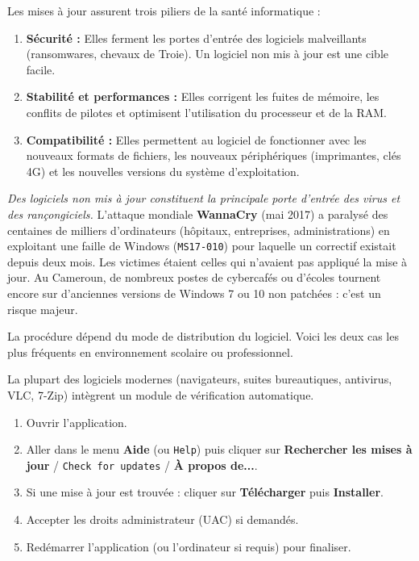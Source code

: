 \documentclass[11pt]{article}
\newcounter{popsec}
\newcounter{popsub}
\newcommand{\courssub}[1]{%
  \stepcounter{popsub}%
  \par\vspace{9pt}\noindent{\popxbold\fontsize{11.5}{13}\selectfont\color{popink}{\color{poporange}\thepopsec.\thepopsub}\hspace{6pt}#1}\par\nopagebreak\vspace{4pt}
}
\begin{document}
\begin{propriete}
Les mises à jour assurent trois piliers de la santé informatique :
\begin{enumerate}
    \item \textbf{Sécurité :} Elles ferment les portes d'entrée des logiciels malveillants (ransomwares, chevaux de Troie). Un logiciel non mis à jour est une cible facile.
    \item \textbf{Stabilité et performances :} Elles corrigent les fuites de mémoire, les conflits de pilotes et optimisent l'utilisation du processeur et de la RAM.
    \item \textbf{Compatibilité :} Elles permettent au logiciel de fonctionner avec les nouveaux formats de fichiers, les nouveaux périphériques (imprimantes, clés 4G) et les nouvelles versions du système d'exploitation.
\end{enumerate}
\end{propriete}

\begin{attention}
\emph{Des logiciels non mis à jour constituent la principale porte d'entrée des virus et des rançongiciels.} L'attaque mondiale \textbf{WannaCry} (mai 2017) a paralysé des centaines de milliers d'ordinateurs (hôpitaux, entreprises, administrations) en exploitant une faille de Windows (\texttt{MS17-010}) pour laquelle un correctif existait depuis deux mois. Les victimes étaient celles qui n'avaient pas appliqué la mise à jour. Au Cameroun, de nombreux postes de cybercafés ou d'écoles tournent encore sur d'anciennes versions de Windows 7 ou 10 non patchées : c'est un risque majeur.
\end{attention}

\courssub{Comment mettre à jour une application ?}

La procédure dépend du mode de distribution du logiciel. Voici les deux cas les plus fréquents en environnement scolaire ou professionnel.

\begin{methode}
La plupart des logiciels modernes (navigateurs, suites bureautiques, antivirus, VLC, 7-Zip) intègrent un module de vérification automatique.
\begin{enumerate}
    \item Ouvrir l'application.
    \item Aller dans le menu \textbf{Aide} (ou \texttt{Help}) puis cliquer sur \textbf{Rechercher les mises à jour} / \texttt{Check for updates} / \textbf{À propos de...}.
    \item Si une mise à jour est trouvée : cliquer sur \textbf{Télécharger} puis \textbf{Installer}.
    \item Accepter les droits administrateur (UAC) si demandés.
    \item Redémarrer l'application (ou l'ordinateur si requis) pour finaliser.
\end{enumerate}
\end{methode}
\end{document}
